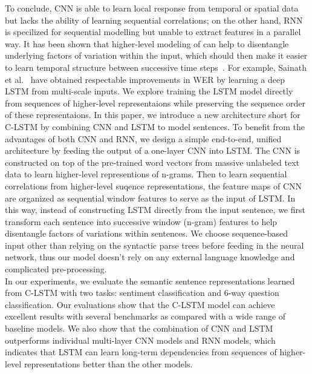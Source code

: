 \documentclass[11pt,letterpaper]{article}
\begin{document}
\indent To conclude, CNN is able to learn local response from temporal or spatial data but lacks the ability of learning sequential correlations; on the other hand, RNN is specilized for sequential modelling but unable to extract features in a parallel way.
It has been shown that higher-level modeling of  can help to disentangle underlying factors of variation within the input, which should then make it easier to learn temporal structure between successive time steps~\cite{evidence}. For example, Sainath et al.~\cite{saina} have obtained respectable improvements in WER by learning a deep LSTM from multi-scale  inputs.
We explore training the LSTM model directly from sequences of higher-level representaions while preserving the sequence order of these representaions.
In this paper, we introduce a new architecture short for C-LSTM by combining CNN and LSTM to model sentences.
To benefit from the advantages of both CNN and RNN, we design a simple end-to-end, unified architecture by feeding the output of a one-layer CNN into LSTM.
The CNN is constructed on top of the pre-trained word vectors from massive unlabeled text data to learn higher-level representions of n-grams.
Then to learn sequential correlations from higher-level suqence representations, the feature maps of CNN are organized as sequential window features to serve as the input of LSTM.
In this way, instead of constructing LSTM directly from the input sentence, we first transform each sentence into successive window (n-gram) features to help disentangle factors of variations within sentences.
We choose sequence-based input other than relying on the syntactic parse trees before feeding in the neural network, thus our model doesn't rely on any external language knowledge and complicated pre-processing.\\
\indent In our experiments, we evaluate the semantic sentence
representations learned from C-LSTM with two tasks: sentiment
classification and 6-way question classification. Our evaluations show
that the C-LSTM model can achieve excellent results with several benchmarks
as compared with a wide range of baseline models. We also show that the
combination of CNN and LSTM outperforms individual multi-layer CNN
models and RNN models, which indicates that LSTM can learn
long-term dependencies from sequences of higher-level representations
better than the other models.
\end{document}
